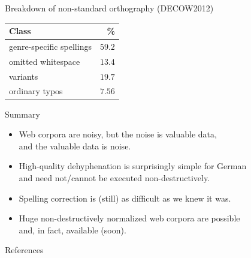 \documentclass{beamer}
\newcommand{\graw}[1]{{\color[rgb]{0.8,0.8,0.8}#1}}
\newcounter{lastpagemainpart}
\begin{document}
\begin{frame}
  {Breakdown of non-standard orthography (DECOW2012)} 
  \begin{center}
    \begin{tabular}{l|r}
      \hline
      Class & \%\\
      \hline
      genre-specific spellings & $59.2$\\
      omitted whitespace & $13.4$\\
      variants        & $19.7$\\
      ordinary typos & $7.56$\\
      \hline    
    \end{tabular}
  \end{center}
\end{frame}





\begin{frame}
  {Summary}
  \begin{itemize}
    \item Web corpora are noisy, but the noise is valuable data,\\
      and the valuable data is noise.
    \item High-quality dehyphenation is surprisingly simple \graw{for German}\\
      and need not\slash cannot be executed non-destructively.
    \item Spelling correction is (still) as difficult as we knew it was.
    \item Huge non-destructively normalized web corpora are possible\\
      and, in fact, available (soon).
  \end{itemize}
\end{frame}


\begin{frame}[allowframebreaks]
{References}
\def\newblock{\hskip .11em plus .33em minus .07em}
\tiny
 

\end{frame}

\makeatletter
\setcounter{lastpagemainpart}{\the\c@framenumber}
\makeatother


\end{document}
